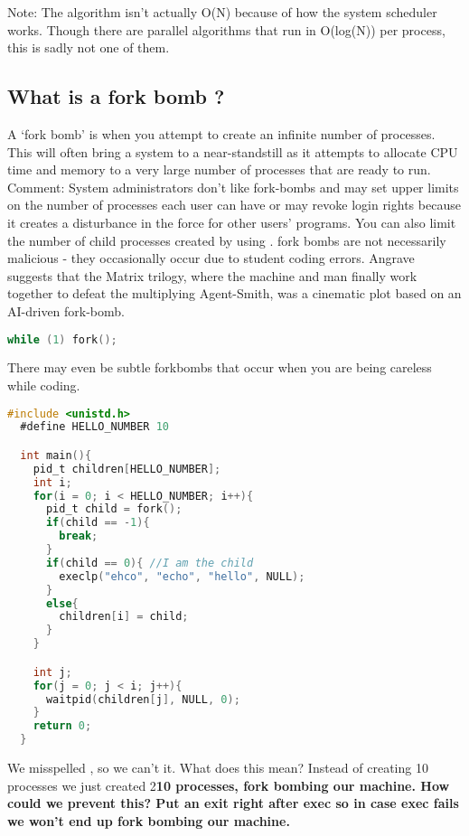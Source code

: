 Note: The algorithm isn't actually O(N) because of how the system scheduler works. Though there are parallel algorithms that run in O(log(N)) per process, this is sadly not one of them.

\subsection{What is a fork bomb ?}

A `fork bomb' is when you attempt to create an infinite number of processes. This will often bring a system to a near-standstill as it attempts to allocate CPU time and memory to a very large number of processes that are ready to run. Comment: System administrators don't like fork-bombs and may set upper limits on the number of processes each user can have or may revoke login rights because it creates a disturbance in the force for other users' programs. You can also limit the number of child processes created by using . fork bombs are not necessarily malicious - they occasionally occur due to student coding errors. Angrave suggests that the Matrix trilogy, where the machine and man finally work together to defeat the multiplying Agent-Smith, was a cinematic plot based on an AI-driven fork-bomb.

\begin{lstlisting}[language=C]
  while (1) fork();
\end{lstlisting}

There may even be subtle forkbombs that occur when you are being careless while coding.

\begin{lstlisting}[language=C]
  #include <unistd.h>
  #define HELLO_NUMBER 10

  int main(){
    pid_t children[HELLO_NUMBER];
    int i;
    for(i = 0; i < HELLO_NUMBER; i++){
      pid_t child = fork();
      if(child == -1){
        break;
      }
      if(child == 0){ //I am the child
        execlp("ehco", "echo", "hello", NULL);
      }
      else{
        children[i] = child;
      }
    }

    int j;
    for(j = 0; j < i; j++){
      waitpid(children[j], NULL, 0);
    }
    return 0;
  }
\end{lstlisting}

We misspelled , so we can't  it. What does this mean? Instead of creating 10 processes we just created 2\textbf{10 processes, fork bombing our machine. How could we prevent this? Put an exit right after exec so in case exec fails we won't end up fork bombing our machine.}

